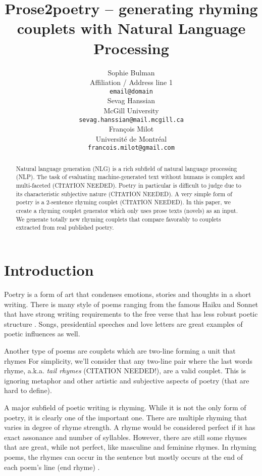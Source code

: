 \documentclass[11pt,a4paper]{article}
\title{Prose2poetry -- generating rhyming couplets with Natural Language Processing}
\author{Sophie Bulman \\
  Affiliation / Address line 1 \\
  \texttt{email@domain} \\\And
  Sevag Hanssian \\
  McGill University \\
  \texttt{sevag.hanssian@mail.mcgill.ca} \\\And
  François Milot \\
  Université de Montréal \\
  \texttt{francois.milot@gmail.com} \\}
\date{}
\begin{document}
\maketitle
\textcolor{blue}{
\begin{abstract}
Natural language generation (NLG) is a rich subfield of natural language processing (NLP). The task of evaluating machine-generated text without humans is complex and multi-faceted (CITATION NEEDED). Poetry in particular is difficult to judge due to its characteristic subjective nature (CITATION NEEDED). A very simple form of poetry is a 2-sentence rhyming couplet (CITATION NEEDED). In this paper, we create a rhyming couplet generator which only uses prose texts (novels) as an input. We generate totally new rhyming couplets that compare favorably to couplets extracted from real published poetry.
\end{abstract}
}

\section{Introduction}

Poetry is a form of art that condenses emotions, stories and thoughts in a short writing. There is many style of poems ranging from the famous Haiku and Sonnet that have strong writing requirements to the free verse that has less robust poetic structure \citep{poem_type}. Songs, presidential speeches and love letters are great examples of poetic influences as well. 

Another type of poems are couplets which are two-line forming a unit that rhymes \cite{couplet_def} For simplicity, we'll consider that any two-line pair where the last words rhyme, a.k.a. \textit{tail rhymes} (CITATION NEEDED!), are a valid couplet. This is ignoring metaphor and other artistic and subjective aspects of poetry (that are hard to define).

A major subfield of poetic writing is rhyming. While it is not the only form of poetry, it is clearly one of the important one. There are multiple rhyming that varies in degree of rhyme strength. A rhyme would be considered perfect if it has exact assonance and number of syllables. However, there are still some rhymes that are great, while not perfect, like masculine and feminine rhymes. In rhyming poems, the rhymes can occur in the sentence but mostly occurs at the end of each poem's line (end rhyme) \citep{poem_rhyme_type}.
\end{document}
